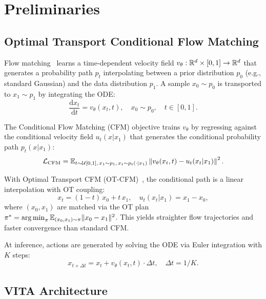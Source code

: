 \section{Preliminaries}
\label{sec:preliminaries}

\subsection{Optimal Transport Conditional Flow Matching}

Flow matching~\cite{lipman2023flow} learns a time-dependent velocity field $v_\theta: \mathbb{R}^d \times [0,1] \to \mathbb{R}^d$ that generates a probability path $p_t$ interpolating between a prior distribution $p_0$ (e.g., standard Gaussian) and the data distribution $p_1$. A sample $x_0 \sim p_0$ is transported to $x_1 \sim p_1$ by integrating the ODE:
\begin{equation}
    \frac{\mathrm{d}x_t}{\mathrm{d}t} = v_\theta(x_t, t), \quad x_0 \sim p_0, \quad t \in [0, 1].
    \label{eq:flow_ode}
\end{equation}

The Conditional Flow Matching (CFM) objective trains $v_\theta$ by regressing against the conditional velocity field $u_t(x | x_1)$ that generates the conditional probability path $p_t(x | x_1)$:
\begin{equation}
    \mathcal{L}_{\text{CFM}} = \mathbb{E}_{t \sim \mathcal{U}[0,1],\, x_1 \sim p_1,\, x_t \sim p_t(\cdot|x_1)} \left\| v_\theta(x_t, t) - u_t(x_t | x_1) \right\|^2.
    \label{eq:cfm_loss}
\end{equation}

With Optimal Transport CFM (OT-CFM)~\cite{tong2024improving}, the conditional path is a linear interpolation with OT coupling:
\begin{equation}
    x_t = (1 - t)\, x_0 + t\, x_1, \quad u_t(x_t | x_1) = x_1 - x_0,
    \label{eq:ot_interpolation}
\end{equation}
where $(x_0, x_1)$ are matched via the OT plan $\pi^* = \operatorname*{arg\,min}_\pi \mathbb{E}_{(x_0,x_1)\sim\pi}\|x_0 - x_1\|^2$. This yields straighter flow trajectories and faster convergence than standard CFM.

At inference, actions are generated by solving the ODE via Euler integration with $K$ steps:
\begin{equation}
    x_{t+\Delta t} = x_t + v_\theta(x_t, t) \cdot \Delta t, \quad \Delta t = 1/K.
    \label{eq:euler_sampling}
\end{equation}

\subsection{VITA Architecture}
\label{sec:vita_arch}

